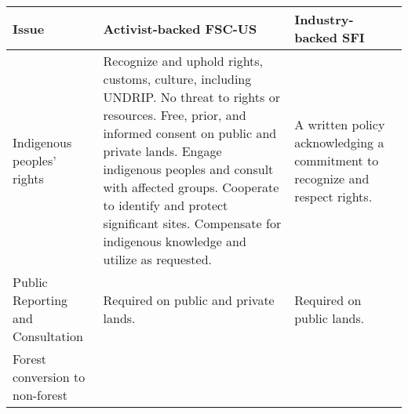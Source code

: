 \begin{table}
\caption{Qualitative Levels of Performance Required for Certification}
\label{issues}
\footnotesize\sf\centering

\begin{longtable*}[]{@{}lll@{}}
\toprule
\begin{minipage}[b]{0.20\columnwidth}\raggedright\strut
Issue\strut
\end{minipage} & \begin{minipage}[b]{0.36\columnwidth}\raggedright\strut
Activist-backed FSC-US\strut
\end{minipage} & \begin{minipage}[b]{0.36\columnwidth}\raggedright\strut
Industry-backed SFI\strut
\end{minipage}\tabularnewline
\midrule
\endhead
\begin{minipage}[t]{0.20\columnwidth}\raggedright\strut
Indigenous peoples' rights\strut
\end{minipage} & \begin{minipage}[t]{0.36\columnwidth}\raggedright\strut
Recognize and uphold rights, customs, culture, including UNDRIP. No
threat to rights or resources. Free, prior, and informed consent on
public and private lands. Engage indigenous peoples and consult with
affected groups. Cooperate to identify and protect significant sites.
Compensate for indigenous knowledge and utilize as requested.\strut
\end{minipage} & \begin{minipage}[t]{0.36\columnwidth}\raggedright\strut
A written policy acknowledging a commitment to recognize and respect
rights.\strut
\end{minipage}\tabularnewline
\begin{minipage}[t]{0.20\columnwidth}\raggedright\strut
Public Reporting and Consultation\strut
\end{minipage} & \begin{minipage}[t]{0.36\columnwidth}\raggedright\strut
Required on public and private lands.\strut
\end{minipage} & \begin{minipage}[t]{0.36\columnwidth}\raggedright\strut
Required on public lands.\strut
\end{minipage}\tabularnewline
\begin{minipage}[t]{0.20\columnwidth}\raggedright\strut
Forest conversion to non-forest\strut
\end{minipage} & \begin{minipage}[t]{0.36\columnwidth}\raggedright\strut

\end{minipage}
\end{longtable*}
\end{table}
